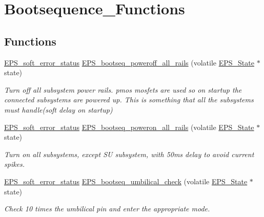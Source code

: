 \hypertarget{group__bootsequence___functions}{\section{Bootsequence\-\_\-\-Functions}
\label{group__bootsequence___functions}
}
\subsection*{Functions}
\begin{DoxyCompactItemize}
\item 
\hyperlink{group__softerror_ga82875cd4cc1b94ab7e638961c1b79e08}{E\-P\-S\-\_\-soft\-\_\-error\-\_\-status} \hyperlink{group__bootsequence___functions_gab53e7a83de602916760ec8a7328a4b16}{E\-P\-S\-\_\-bootseq\-\_\-poweroff\-\_\-all\-\_\-rails} (volatile \hyperlink{struct_e_p_s___state}{E\-P\-S\-\_\-\-State} $\ast$state)
\begin{DoxyCompactList}\small\item\em Turn off all subsystem power rails. pmos mosfets are used so on startup the connected subsystems are powered up. This is something that all the subsystems must handle(soft delay on startup) \end{DoxyCompactList}\item 
\hyperlink{group__softerror_ga82875cd4cc1b94ab7e638961c1b79e08}{E\-P\-S\-\_\-soft\-\_\-error\-\_\-status} \hyperlink{group__bootsequence___functions_gaae0fe32313dbd8724dfc256810e5d7a3}{E\-P\-S\-\_\-bootseq\-\_\-poweron\-\_\-all\-\_\-rails} (volatile \hyperlink{struct_e_p_s___state}{E\-P\-S\-\_\-\-State} $\ast$state)
\begin{DoxyCompactList}\small\item\em Turn on all subsystems, except S\-U subsystem, with 50ms delay to avoid current spikes. \end{DoxyCompactList}\item 
\hyperlink{group__softerror_ga82875cd4cc1b94ab7e638961c1b79e08}{E\-P\-S\-\_\-soft\-\_\-error\-\_\-status} \hyperlink{group__bootsequence___functions_gadb28d55e8dce0744c3716a0cec896698}{E\-P\-S\-\_\-bootseq\-\_\-umbilical\-\_\-check} (volatile \hyperlink{struct_e_p_s___state}{E\-P\-S\-\_\-\-State} $\ast$state)
\begin{DoxyCompactList}\small\item\em Check 10 times the umbilical pin and enter the appropriate mode. \end{DoxyCompactList}\item 

\end{DoxyCompactItemize}
